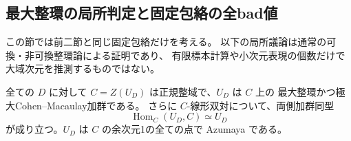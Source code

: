 \subsection{最大整環の局所判定と固定包絡の全bad値}
\label{subsec:order4-local-orders}
この節では前二節と同じ固定包絡だけを考える。
以下の局所議論は通常の可換・非可換整環論による証明であり、
有限標本計算や小次元表現の個数だけで大域次元を推測するものではない。

\begin{lemma}[対称な非分岐最大整環]
\label{lem:order4-symmetric-maximal}
全ての $D$ に対して $C=Z(U_D)$ は正規整域で、$U_D$ は $C$ 上の
最大整環かつ極大Cohen--Macaulay加群である。
さらに $C$-線形双対について、両側加群同型
\[
 \operatorname{Hom}_C(U_D,C)\simeq U_D
\]
が成り立つ。$U_D$ は $C$ の余次元1の全ての点で Azumaya である。
\end{lemma}
